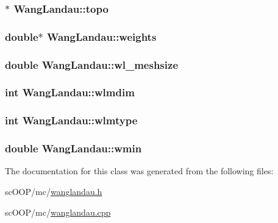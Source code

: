 \hypertarget{class_wang_landau_a501fc7de450a2e78e5817331ec748517}{
\subsubsection[{topo}]{$\ast$ Wang\+Landau\+::topo}}\label{class_wang_landau_a501fc7de450a2e78e5817331ec748517}
\hypertarget{class_wang_landau_ad496dccf54ec8d44362b51e4e9df6a0a}{
\subsubsection[{weights}]{\setlength{\rightskip}{0pt plus 5cm}double$\ast$ Wang\+Landau\+::weights}}\label{class_wang_landau_ad496dccf54ec8d44362b51e4e9df6a0a}
\hypertarget{class_wang_landau_ae8655cc00c6200de6523e4eef767d5ed}{
\subsubsection[{wl\+\_\+meshsize}]{\setlength{\rightskip}{0pt plus 5cm}double Wang\+Landau\+::wl\+\_\+meshsize}}\label{class_wang_landau_ae8655cc00c6200de6523e4eef767d5ed}
\hypertarget{class_wang_landau_a7ad19ee80822168ea3ee712529f1b96d}{
\subsubsection[{wlmdim}]{\setlength{\rightskip}{0pt plus 5cm}int Wang\+Landau\+::wlmdim}}\label{class_wang_landau_a7ad19ee80822168ea3ee712529f1b96d}
\hypertarget{class_wang_landau_ae307e86eafae0c11461c0beac5462868}{
\subsubsection[{wlmtype}]{\setlength{\rightskip}{0pt plus 5cm}int Wang\+Landau\+::wlmtype}}\label{class_wang_landau_ae307e86eafae0c11461c0beac5462868}
\hypertarget{class_wang_landau_a322c81039b5e71972667d3fac00e2576}{
\subsubsection[{wmin}]{\setlength{\rightskip}{0pt plus 5cm}double Wang\+Landau\+::wmin}}\label{class_wang_landau_a322c81039b5e71972667d3fac00e2576}


The documentation for this class was generated from the following files\+:\begin{DoxyCompactItemize}
\item 
sc\+O\+O\+P/mc/\hyperlink{wanglandau_8h}{wanglandau.\+h}\item 
sc\+O\+O\+P/mc/\hyperlink{wanglandau_8cpp}{wanglandau.\+cpp}\end{DoxyCompactItemize}

